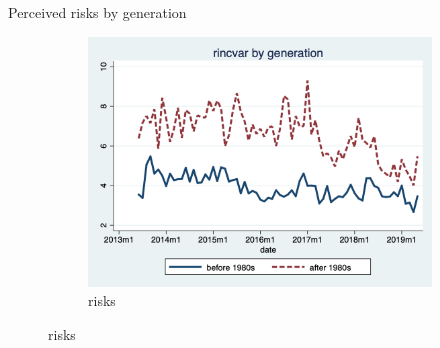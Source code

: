 \documentclass{beamer}
\begin{document}


\begin{frame}{Perceived risks by generation}
	\begin{figure}[ht]
		\label{ts_incvar_byear_g_mean}
		\begin{subfigure}[b]{0.46\textwidth}
			\centering
			\caption{risks}
			\includegraphics[width=\textwidth, height = 0.33\textheight]{figures/ts_rincvar_byear_g_median.png}
		\end{subfigure}
	\end{figure}
\end{frame}


\end{document}
